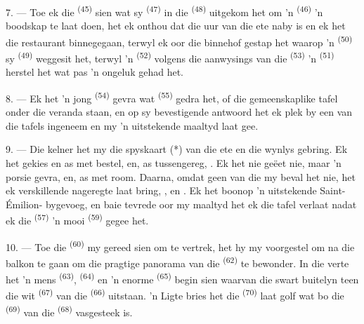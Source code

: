 7. --- Toe ek die  \textsuperscript{(45)} sien wat sy 
\textsuperscript{(47)} in die  \textsuperscript{(48)} uitgekom
het om 'n  \textsuperscript{(46)} 'n boodskap te laat doen, het ek
onthou dat die uur van die ete naby is en ek het die restaurant binnegegaan, terwyl ek
oor die binnehof gestap het waarop 'n  \textsuperscript{(50)} sy
 \textsuperscript{(49)} weggesit het, terwyl 'n 
\textsuperscript{(52)} volgens die aanwysings van die 
\textsuperscript{(53)} 'n  \textsuperscript{(51)} herstel het wat
pas 'n ongeluk gehad het.

8. --- Ek het 'n jong  \textsuperscript{(54)} gevra wat
 \textsuperscript{(55)} gedra het, of die gemeenskaplike tafel onder
die veranda staan, en op sy bevestigende antwoord het ek plek by een van die tafels
ingeneem en my 'n uitstekende maaltyd laat gee.


\VUsaut{4.0mm}
\VUsaut{3.0mm}

9. --- Die kelner het my die spyskaart (*) van die ete en die wynlys gebring. Ek het
gekies en as  met  bestel, en, as
tussengereg, . Ek het nie  geëet nie, maar
'n porsie  gevra, en, as  met room.
Daarna, omdat geen van die  my beval het nie, het ek verskillende
nageregte laat bring, ,  en . Ek het boonop
'n uitstekende Saint-Émilion- bygevoeg, en baie tevrede oor my maaltyd het ek
die tafel verlaat nadat ek die  \textsuperscript{(57)} 'n mooi
 \textsuperscript{(59)} gegee het.

10. --- Toe die  \textsuperscript{(60)} my gereed sien om te vertrek,
het hy my voorgestel om na die balkon te gaan om die pragtige panorama van die
 \textsuperscript{(62)} te bewonder. In die verte het 'n mens 
\textsuperscript{(63)},  \textsuperscript{(64)} en 'n enorme
 \textsuperscript{(65)} begin sien waarvan die swart buitelyn teen die
wit  \textsuperscript{(67)} van die  \textsuperscript{(66)}
uitstaan. 'n Ligte bries het die  \textsuperscript{(70)} laat golf wat bo
die  \textsuperscript{(69)} van die 
\textsuperscript{(68)} vasgesteek is.

